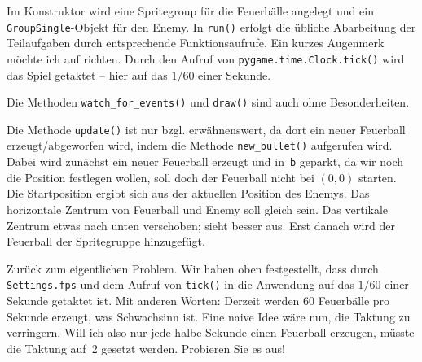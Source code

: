 
Im Konstruktor wird eine Spritegroup für die Feuerbälle angelegt und ein \texttt{GroupSingle}-Objekt für den Enemy. In \texttt{run()} erfolgt die übliche Abarbeitung der Teilaufgaben durch entsprechende Funktionsaufrufe. Ein kurzes Augenmerk möchte ich auf  richten. Durch den Aufruf von \texttt{pygame.time.Clock.tick()} wird das Spiel getaktet -- hier auf das $1/60$ einer Sekunde. 


Die Methoden \texttt{watch\_for\_events()} und \texttt{draw()} sind auch ohne Besonderheiten.


Die Methode \texttt{update()} ist nur bzgl.  erwähnenswert, da dort ein neuer Feuerball erzeugt/abgeworfen wird, indem die Methode \texttt{new\_bullet()} aufgerufen wird. Dabei wird zunächst ein neuer Feuerball erzeugt und in~\texttt{b} geparkt, da wir noch die Position festlegen wollen, soll doch der Feuerball nicht bei $(0,0)$ starten. Die Startposition ergibt sich aus der aktuellen Position des Enemys. Das horizontale Zentrum von Feuerball und Enemy soll gleich sein. Das vertikale Zentrum etwas nach unten verschoben; sieht besser aus. Erst danach wird der Feuerball der Spritegruppe hinzugefügt.



Zurück zum eigentlichen Problem. Wir haben oben festgestellt, dass durch \texttt{Settings.fps} und dem Aufruf von \texttt{tick()} in  die Anwendung auf das $1/60$ einer Sekunde getaktet ist. Mit anderen Worten: Derzeit werden 60 Feuerbälle pro Sekunde erzeugt, was Schwachsinn ist. Eine naive Idee wäre nun, die Taktung zu verringern. Will ich also nur jede halbe Sekunde einen Feuerball erzeugen, müsste die Taktung auf~2 gesetzt werden. Probieren Sie es aus!

